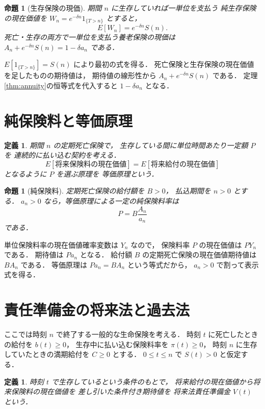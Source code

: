 \documentclass[a5paper,10pt,onecolumn]{jsarticle}
\makeatletter
\theoremstyle{mathnotetheorem}
\newtheorem{definition}[theorem]{定義}
\newtheorem{proposition}[theorem]{命題}
\renewcommand{\proofname}{証明}
\renewenvironment{proof}[1][\proofname]{%
  \par\pushQED{\qed}\normalfont\topsep4\p@\@plus2\p@\relax
  \trivlist\item[\hskip\labelsep\bfseries #1]\ignorespaces
}{\popQED\endtrivlist\@endpefalse}
\makeatother
\begin{document}
\begin{proposition}[生存保険の現価]\label{prop:endowment}
期間 $n$ に生存していれば一単位を支払う
純生存保険の現在価値を
$W_n=e^{-\delta n}1_{\{T>n\}}$ とすると，
\[
 E[W_n]=e^{-\delta n}S(n).
\]
死亡・生存の両方で一単位を支払う養老保険の現価は
$A_n+e^{-\delta n}S(n)=1-\delta a_n$ である．
\end{proposition}
\begin{proof}
$E[1_{\{T>n\}}]=S(n)$ により最初の式を得る．
死亡保険と生存保険の現在価値を足したものの期待値は，
期待値の線形性から
$A_n+e^{-\delta n}S(n)$ である．
定理\ref{thm:annuity}の恒等式を代入すると
$1-\delta a_n$ となる．
\end{proof}

\section{純保険料と等価原理}

\begin{definition}
期間 $n$ の定期死亡保険で，
生存している間に単位時間あたり一定額 $P$ を
連続的に払い込む契約を考える．
\[
 E[\text{将来保険料の現在価値}]
 =E[\text{将来給付の現在価値}]
\]
となるように $P$ を選ぶ原理を
\emph{等価原理}という．
\end{definition}

\begin{proposition}[純保険料]\label{prop:level-premium}
定期死亡保険の給付額を $B>0$，
払込期間を $n>0$ とする．
$a_n>0$ なら，等価原理による一定の純保険料率は
\[
 P=B\frac{A_n}{a_n}
\]
である．
\end{proposition}
\begin{proof}
単位保険料率の現在価値確率変数は $Y_n$ なので，
保険料率 $P$ の現在価値は $P Y_n$ である．
期待値は $P a_n$ となる．
給付額 $B$ の定期死亡保険の現在価値期待値は
$B A_n$ である．
等価原理は $P a_n=B A_n$ という等式だから，
$a_n>0$ で割って表示式を得る．
\end{proof}

\section{責任準備金の将来法と過去法}

ここでは時刻 $n$ で終了する一般的な生命保険を考える．
時刻 $t$ に死亡したときの給付を $b(t)\ge0$，
生存中に払い込む保険料率を $\pi(t)\ge0$，
時刻 $n$ に生存していたときの満期給付を $C\ge0$ とする．
$0\le t\le n$ で $S(t)>0$ と仮定する．

\begin{definition}
時刻 $t$ で生存しているという条件のもとで，
将来給付の現在価値から将来保険料の現在価値を
差し引いた条件付き期待値を
\emph{将来法責任準備金} $V(t)$ という．
\end{definition}
\end{document}
